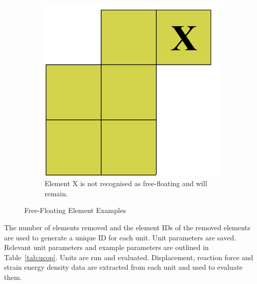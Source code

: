 \begin{figure}[H]
\begin{subfigure}[t]{.3\linewidth}
    \centering\includegraphics[width=.8\linewidth]{notfree1.png}
    \caption{Element X is not recognised as free-floating and will remain.}
  \end{subfigure}
  \caption{Free-Floating Element Examples}
  \label{fig:ffee}
\end{figure}

The number of elements removed and the element IDs of the removed elements are used to generate a unique ID for each unit. Unit parameters are saved. Relevant unit parameters and example parameters are outlined in Table~\ref{tab:ucop}. Units are run and evaluated. Displacement, reaction force and strain energy density data are extracted from each unit and used to evaluate them.

